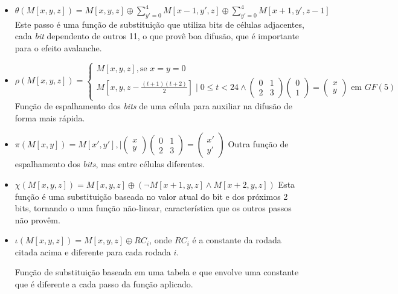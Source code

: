 \begin{itemize}
    \setlength\itemsep{1em}

    \item $\theta(M[x, y, z]) = M[x, y, z] \oplus \sum\limits_{y'=0}^{4}M[x-1, y', z] \oplus \sum\limits_{y'=0}^{4}M[x+1, y', z-1]$ \newline
        Este passo é uma função de substituição que utiliza bits de células
        adjacentes, cada \textit{bit} dependento de outros 11, o que provê boa
        difusão, que é importante para o efeito avalanche.

    \item $\rho(M[x, y, z]) = \begin{cases}
            M[x, y, z], \mbox{se } x=y=0 \\
            M[x, y, z - \frac{(t+1)(t+2)}{2}] \mid 0 \leq t < 24 \land \begin{pmatrix}0 & 1 \\ 2 & 3\end{pmatrix} \begin{pmatrix}0 \\ 1\end{pmatrix} = \begin{pmatrix}x \\ y\end{pmatrix}\mbox{ em } GF(5)
        \end{cases}$ \newline
        Função de espalhamento dos \textit{bits} de uma célula para auxiliar na
        difusão de forma mais rápida.

    \item $\pi(M[x, y]) = M[x', y'], \mid \begin{pmatrix}x \\ y\end{pmatrix}\begin{pmatrix}0 & 1 \\ 2 & 3\end{pmatrix} = \begin{pmatrix}x' \\ y'\end{pmatrix}$ \newline
        Outra função de espalhamento dos \textit{bits}, mas entre células
        diferentes.

    \item $\chi(M[x, y, z]) = M[x, y, z] \oplus (\neg{M}[x+1, y, z] \land M[x+2, y, z])$ \newline
        Esta função é uma substituição baseada no valor atual do bit e dos
        próximos 2 bits, tornando o \Keccak{} uma função não-linear,
        característica que os outros passos não provêm.

    \item $\iota(M[x, y, z]) = M[x, y, z] \oplus RC_{i}$, onde $RC_{i}$ é a
        constante da rodada citada acima e diferente para cada rodada $i$.

        Função de substituição baseada em uma tabela e que envolve uma
        constante que é diferente a cada passo da função aplicado.
\end{itemize}

